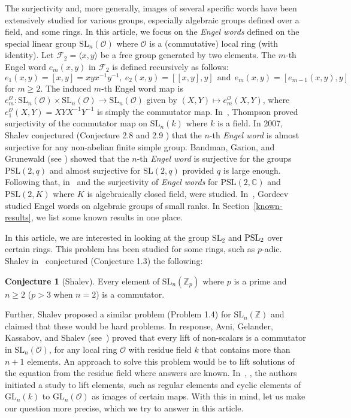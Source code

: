 \documentclass[10pt,twoside]{amsart}
\newcommand{\SL}{\mathrm{SL}}
\theoremstyle{definition}
\theoremstyle{definition}
\newtheorem{conjecture}{Conjecture}
\begin{document}
The surjectivity and, more generally, images of several specific words have been extensively studied for various groups, especially algebraic groups defined over a field, and some rings. In this article, we focus on the \emph{Engel words} defined on the special linear group $\mathrm{SL}_n(\mathcal O)$ where $\mathcal O$ is a (commutative) local ring (with identity). Let $\mathcal F_2 = \langle x, y\rangle$ be a free group generated by two elements. The $m$-th Engel word $e_m(x, y)$ in $\mathcal F_2$ is defined recursively as follows: $$e_1(x, y)=[x, y] = xyx^{-1}y^{-1}, \ e_2(x, y)=[[x, y], y]\ \ \text{and}\ \  e_{m}(x, y)=[e_{m-1}(x, y), y]$$ 
for $m\geq 2$. The induced $m$-th Engel word map is $e_{m}^{\mathcal{O}}\colon \mathrm{SL}_n(\mathcal{O}) \times \mathrm{SL}_n(\mathcal{O}) \rightarrow \mathrm{SL}_n(\mathcal{O})$ given by $(X, Y)\mapsto e_{m}^{\mathcal{O}}(X, Y)$, where $e_1^{\mathcal{O}}(X,Y) = XYX^{-1}Y^{-1}$ is simply the commutator map. In~\cite{Thompson1961}, Thompson proved surjectivity of the commutator map on $\mathrm{SL}_n(k)$ where $k$ is a field. In 2007, Shalev conjectured (Conjecture 2.8 and 2.9 \cite{Shalev2007}) that the $n$-th \emph{Engel word} is almost surjective for any non-abelian finite simple group. Bandman, Garion, and Grunewald (see \cite{BandmanGarionGrunewald2012}) showed that the $n$-th \emph{Engel word} is surjective for the groups $\mathrm{PSL}(2, q)$ and almost surjective for $\mathrm{SL}(2, q)$ provided $q$ is large enough. Following that, in~\cite{BaZa2016} and \cite{BNT2024} the surjectivity of \emph{Engel words} for $\mathrm{PSL}(2,\mathbb{C})$ and $\mathrm{PSL}(2, K)$ where $K$ is algebraically closed field, were studied. In~\cite{Gordeev}, Gordeev studied Engel words on algebraic groups of small ranks. In Section~\ref{known-results}, we list some known results in one place.

In this article, we are interested in looking at the group $\SL_2$ and $\rm{PSL}_2$ over certain rings. This problem has been studied for some rings, such as $p$-adic. Shalev in~\cite{Shalevzeta} conjectured (Conjecture 1.3) the following:  
\begin{conjecture}[Shalev]
Every element of $\mathrm{SL}_n(\mathbb{Z}_p)$ where $p$ is a prime and $n\geq 2$ ($p>3$ when $n=2$) is a commutator.
\end{conjecture}
\noindent Further, Shalev proposed a similar problem (Problem 1.4) for $\SL_n(\mathbb Z)$ and claimed that these would be hard problems. In response, Avni, Gelander, Kassabov, and Shalev (see~\cite{AvniGelanderKassabovShalev}) proved that every lift of non-scalars is a commutator in $\mathrm{SL}_n(\mathcal{O})$, for any local ring $\mathcal{O}$ with residue field $k$ that contains more than $n+1$ elements. An approach to solve this problem would be to lift solutions of the equation from the residue field where answers are known. In~\cite{PRS2026}, \cite{PanjaRoySingh2025}, the authors initiated a study to lift elements, such as regular elements and cyclic elements of $\mathrm{GL}_n(k)$ to $\mathrm{GL}_n(\mathcal{O})$ as images of certain maps. With this in mind, let us make our question more precise, which we try to answer in this article.  
\end{document}
